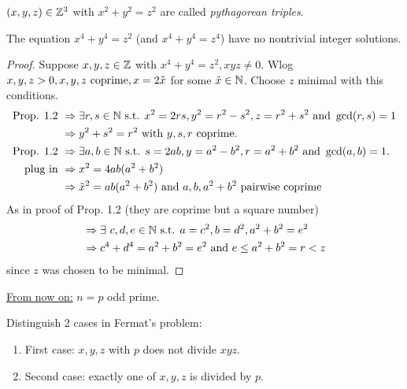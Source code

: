 \begin{Bem*}
$(x,y,z) \in \mathbb{Z}^3$ with $x^2+y^2=z^2$ are called \emph{pythagorean triples}.
\end{Bem*}

\addtocounter{theorem}{-1}
\begin{Prop}[$n=4$]
The equation $x^4+y^4=z^2$ (and $x^4+y^4=z^4$) have no nontrivial integer solutions.
\end{Prop}

\begin{proof}
Suppose $x,y,z \in \mathbb{Z}$ with $x^4+y^4=z^2, xyz \not = 0$. Wlog $x,y,z > 0, x,y,z \text{ coprime},\linebreak
x=2\tilde{x}$ for some $\tilde{x} \in \mathbb{N}$. Choose $z$ minimal with this conditions.
\begin{align*}
\text{Prop. 1.2 } &\Rightarrow \exists r,s \in \mathbb{N} \text{ s.t. } x^2=2rs,y^2=r^2-s^2, z=r^2+s^2 \text{ and } \gcd(r,s)=1\\
&\Rightarrow y^2+s^2=r^2\text{ with }y,s,r \text{ coprime.}\\
\text{Prop. 1.2 } &\Rightarrow \exists a,b \in \mathbb{N} \text{ s.t. } s=2ab, y=a^2-b^2, r=a^2+b^2 \text{ and } \gcd(a,b)=1.\\
\text{plug in } &\Rightarrow x^2=4ab(a^2+b^2)\\
&\Rightarrow \tilde{x}^2=ab(a^2+b^2) \text{ and } a,b,a^2+b^2 \text{ pairwise coprime}
\end{align*}
As in proof of Prop. 1.2 (they are coprime but a square number)
\begin{align*}
&\Rightarrow \exists\ c,d,e \in \mathbb{N} \text{ s.t. } a=c^2, b=d^2, a^2+b^2=e^2\\
&\Rightarrow c^4+d^4=a^2+b^2=e^2 \text{ and } e \leq a^2+b^2 = r < z
\end{align*}
\Lightning since $z$ was chosen to be minimal.
\end{proof}

\underline{From now on:} $n=p$ odd prime.

\begin{idea}[by Germain]
Distinguish 2 cases in Fermat's problem:
\begin{enumerate}
\item \glqq First case\grqq : $x,y,z$ with $p$ does not divide $xyz$.
\item \glqq Second case\grqq : exactly one of $x,y,z$ is divided by $p$.
\end{enumerate}
\end{idea}


